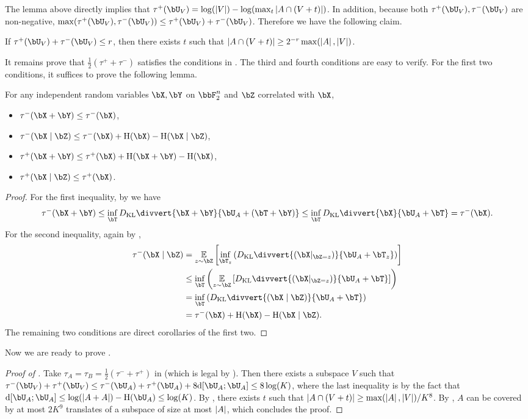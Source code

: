 \documentclass{article}
\newcommand{\KL}{D_{\mathrm{KL}}\divvert}
\DeclarePairedDelimiter{\paren}{(}{)}
\DeclarePairedDelimiter{\sqpar}{[}{]}
\newcommand{\ent}{\mathrm{H}\paren}
\newcommand{\Ruz}{\mathrm{d}\sqpar}
\begin{document}
The lemma above directly implies that $\tau^+\paren{\bU_V}=\log(|V|)-\log(\max_t\abs{A\cap (V+t)})$. In addition, because both $\tau^+\paren{\bU_V},\tau^-\paren{\bU_V}$ are non-negative, $\max(\tau^+\paren{\bU_V},\tau^-\paren{\bU_V})\le \tau^+\paren{\bU_V}+ \tau^-\paren{\bU_V}$. Therefore we have the following claim. 
\begin{claim}\label{lemma:slice}
If $\tau^+(\bU_V)+\tau^-\paren{\bU_V}\le r$, then there exists $t$ such that $\left|A\cap (V+t)\right|\ge 2^{-r}\max(\left|A\right|,\left|V\right|)$.
\end{claim}

It remains prove that $\frac{1}{2}(\tau^++\tau^-)$ satisfies the conditions in . The third and fourth conditions are easy to verify. For the first two conditions, it suffices to prove the following lemma.
\begin{lemma}\label{lemma:KL-eq}
For any independent random variables $\bX,\bY$ on $\bbF_2^n$ and $\bZ$ correlated with $\bX$,
\begin{itemize}
\item
$\tau^-(\bX+\bY)\le \tau^-(\bX)$,
\item 
$\tau^-(\bX\mid\bZ)\le \tau^-(\bX)+\ent{\bX}-\ent{\bX\mid\bZ}$,
\item 
$\tau^+(\bX+\bY)\le \tau^+(\bX)+\ent{\bX+\bY}-\ent{\bX}$,
\item 
$\tau^+(\bX\mid\bZ)\le \tau^+(\bX)$.
\end{itemize}
\end{lemma}
\begin{proof}
For the first inequality, by  we have
$$\tau^-(\bX+\bY)\le \inf_{\bT} \KL{\bX+\bY}{\bU_A+(\bT+\bY)} \le \inf_{\bT} \KL{\bX}{\bU_A+\bT} = \tau^-(\bX).$$
For the second inequality, again by , 
\begin{align*}
\tau^-(\bX\mid \bZ)
&= \ex[z\sim\bZ]{\inf_{\bT_z}\left(\KL{(\bX|_{\bZ=z})}{\bU_A+\bT_z}\right)}\\
&\le \inf_{\bT}\left(\ex[z\sim\bZ]{\KL{(\bX|_{\bZ=z})}{\bU_A+\bT}}\right)\\
&= \inf_{\bT}\left(\KL{(\bX\mid\bZ)}{\bU_A+\bT}\right)\\
&= \tau^-(\bX)+ \ent{\bX}-\ent{\bX\mid\bZ}.
\end{align*}
The remaining two conditions are direct corollaries of the first two.
\end{proof}
Now we are ready to prove .
\begin{proof}[Proof of ]
Take $\tau_A=\tau_B=\frac{1}{2}(\tau^-+\tau^+)$ in  (which is legal by ). Then there exists a subspace $V$ such that $\tau^-(\bU_V)+\tau^+(\bU_V) \le \tau^-(\bU_A)+\tau^+(\bU_A) + 8\Ruz{\bU_A;\bU_A}\le 8\log(K)$, where the last inequality is by the fact that $\Ruz{\bU_A;\bU_A}\le \log(\abs{A+A})-\ent{\bU_A}\le \log(K)$. By , there exists $t$ such that $\left|A\cap(V+t)\right|\ge \max(\left|A\right|,\left|V\right|)/K^8$. By , $A$ can be covered by at most $2K^9$ translates of a subspace of size at most $\left|A\right|$, which concludes the proof.
\end{proof}
\end{document}
